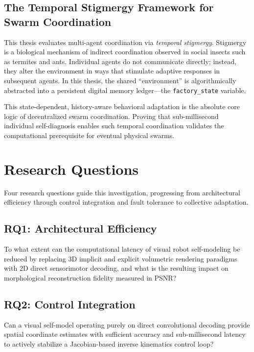 \documentclass[12pt,a4paper,oneside]{report}
\begin{document}
\subsection{The Temporal Stigmergy Framework for Swarm Coordination}
\label{subsec:temporal_stigmergy_framework_intro}

This thesis evaluates multi-agent coordination via \textit{temporal stigmergy}. Stigmergy is a biological mechanism of indirect coordination observed in social insects such as termites and ants. Individual agents do not communicate directly; instead, they alter the environment in ways that stimulate adaptive responses in subsequent agents. In this thesis, the shared ``environment'' is algorithmically abstracted into a persistent digital memory ledger---the \texttt{factory\_state} variable. 

This state-dependent, history-aware behavioral adaptation is the absolute core logic of decentralized swarm coordination. Proving that sub-millisecond individual self-diagnosis enables such temporal coordination validates the computational prerequisite for eventual physical swarms.

\section{Research Questions}
\label{sec:research_questions_intro}

Four research questions guide this investigation, progressing from architectural efficiency through control integration and fault tolerance to collective adaptation.

\subsection{RQ1: Architectural Efficiency}
\label{subsec:RQ1_intro}

To what extent can the computational latency of visual robot self-modeling be reduced by replacing 3D implicit and explicit volumetric rendering paradigms with 2D direct sensorimotor decoding, and what is the resulting impact on morphological reconstruction fidelity measured in PSNR?

\subsection{RQ2: Control Integration}
\label{subsec:RQ2_intro}

Can a visual self-model operating purely on direct convolutional decoding provide spatial coordinate estimates with sufficient accuracy and sub-millisecond latency to actively stabilize a Jacobian-based inverse kinematics control loop?
\end{document}
